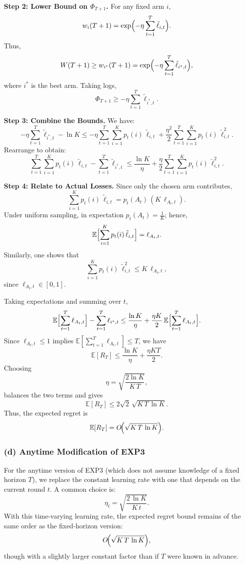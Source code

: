 \medskip
\noindent
\textbf{Step 2: Lower Bound on \(\Phi_{T+1}\).}  
For any fixed arm \(i\),
\[
   w_i(T+1)=\exp\Bigl(-\eta\sum_{t=1}^T\tilde{\ell}_{i,t}\Bigr).
\]
Thus,
\[
   W(T+1)\ge w_{i^*}(T+1)=\exp\Bigl(-\eta\sum_{t=1}^T\tilde{\ell}_{i^*,t}\Bigr),
\]
where \(i^*\) is the best arm. Taking logs,
\[
   \Phi_{T+1}\ge -\eta\sum_{t=1}^T\tilde{\ell}_{i^*,t}.
\]

\medskip
\noindent
\textbf{Step 3: Combine the Bounds.}  
We have:
\[
  -\eta\sum_{t=1}^T\tilde{\ell}_{i^*,t} -\ln K \le -\eta\sum_{t=1}^T\sum_{i=1}^K p_t(i)\,\tilde{\ell}_{i,t} + \frac{\eta^2}{2}\sum_{t=1}^T\sum_{i=1}^K p_t(i)\,\tilde{\ell}_{i,t}^2.
\]
Rearrange to obtain:
\[
  \sum_{t=1}^T\sum_{i=1}^K p_t(i)\,\tilde{\ell}_{i,t} - \sum_{t=1}^T\tilde{\ell}_{i^*,t} \le \frac{\ln K}{\eta} + \frac{\eta}{2}\sum_{t=1}^T\sum_{i=1}^K p_t(i)\,\tilde{\ell}_{i,t}^2.
\]

\medskip
\noindent
\textbf{Step 4: Relate to Actual Losses.}  
Since only the chosen arm contributes,
\[
   \sum_{i=1}^K p_t(i)\,\tilde{\ell}_{i,t} = p_t(A_t)\,(K\,\ell_{A_t,t}).
\]
Under uniform sampling, in expectation \(p_t(A_t)=\frac{1}{K}\); hence,
\[
   \mathbb{E}\Bigl[\sum_{i=1}^K p_t(i)\,\tilde{\ell}_{i,t}\Bigr] = \ell_{A_t,t}.
\]
Similarly, one shows that
\[
   \sum_{i=1}^K p_t(i)\,\tilde{\ell}_{i,t}^2 \le K\,\ell_{A_t,t},
\]
since \(\ell_{A_t,t}\in [0,1]\).

Taking expectations and summing over \(t\),
\[
   \mathbb{E}\Bigl[\sum_{t=1}^T \ell_{A_t,t}\Bigr] - \sum_{t=1}^T \ell_{i^*,t} \le \frac{\ln K}{\eta} + \frac{\eta K}{2}\,\mathbb{E}\Bigl[\sum_{t=1}^T \ell_{A_t,t}\Bigr].
\]
Since \(\ell_{A_t,t}\le 1\) implies \(\mathbb{E}[\sum_{t=1}^T \ell_{A_t,t}]\le T\), we have
\[
   \mathbb{E}[R_T] \le \frac{\ln K}{\eta} + \frac{\eta K T}{2}.
\]
Choosing
\[
   \eta = \sqrt{\frac{2\ln K}{K\,T}},
\]
balances the two terms and gives
\[
   \mathbb{E}[R_T] \le 2\sqrt{2}\,\sqrt{K\,T\,\ln K}.
\]
Thus, the expected regret is
\[
   \mathbb{E}[R_T] = O\!\Bigl(\sqrt{K\,T\,\ln K}\Bigr).
\]

\bigskip
\subsubsection*{(d) Anytime Modification of EXP3}

For the anytime version of EXP3 (which does not assume knowledge of a fixed horizon \(T\)), we replace the constant learning rate with one that depends on the current round \(t\). A common choice is:
\[
    \eta_t = \sqrt{\frac{2\,\ln K}{K\,t}}.
\]
With this time-varying learning rate, the expected regret bound remains of the same order as the fixed-horizon version:
\[
    O\!\Bigl(\sqrt{K\,T\,\ln K}\Bigr),
\]
though with a slightly larger constant factor than if \(T\) were known in advance.